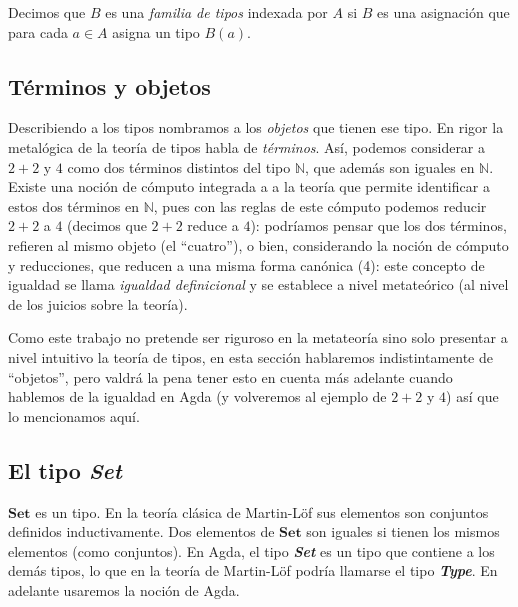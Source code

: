 \documentclass[11pt]{article} %
\begin{document}
Decimos que $B$ es una \textit{familia de tipos} indexada por $A$ si $B$ es una asignación que para cada $a \in A$ asigna un tipo $B(a)$. 

\subsection{Términos y objetos}
Describiendo a los tipos nombramos a los \textit{objetos} que tienen ese tipo. En rigor la metalógica de la teoría de tipos habla de \textit{términos}. Así, podemos considerar a $2 + 2$ y $4$ como dos términos distintos del tipo $\mathbb{N}$, que además son iguales en $\mathbb{N}$. Existe una noción de cómputo integrada a a la teoría que permite identificar a estos dos términos en $\mathbb{N}$, pues con las reglas de este cómputo podemos reducir $2 + 2$ a $4$ (decimos que $2 + 2$ reduce a $4$): podríamos pensar que los dos términos, refieren al mismo objeto (el ``cuatro''), o bien, considerando la noción de cómputo y reducciones, que reducen a una misma forma canónica (4): este concepto de igualdad se llama \textit{igualdad definicional} y se establece a nivel metateórico (al nivel de los juicios sobre la teoría).

Como este trabajo no pretende ser riguroso en la metateoría sino solo presentar a nivel intuitivo la teoría de tipos, en esta sección hablaremos indistintamente de ``objetos'', pero valdrá la pena tener esto en cuenta más adelante cuando hablemos de la igualdad en Agda (y volveremos al ejemplo de $2 + 2$ y $4$) así que lo mencionamos aquí.

\subsection{El tipo \textit{\textbf{Set}}}
$\bm{Set}$ es un tipo. En la teoría clásica de Martin-Löf sus elementos son conjuntos definidos inductivamente. Dos elementos de $\bm{Set}$ son iguales si tienen los mismos elementos (como conjuntos). En Agda, el tipo \textit{\textbf{Set}} es un tipo que contiene a los demás tipos, lo que en la teoría de Martin-Löf podría llamarse el tipo \textit{\textbf{Type}}. En adelante usaremos la noción de Agda.

\end{document}
